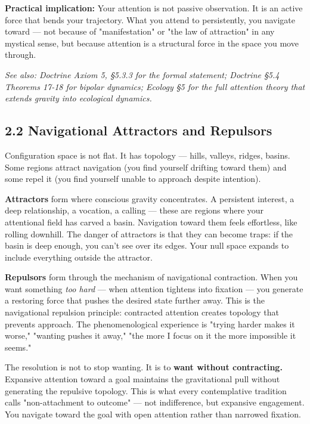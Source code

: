\textbf{Practical implication:} Your attention is not passive observation. It is an active force that bends your trajectory. What you attend to persistently, you navigate toward — not because of "manifestation" or "the law of attraction" in any mystical sense, but because attention is a structural force in the space you move through.


\textit{See also: Doctrine Axiom 5, §5.3.3 for the formal statement; Doctrine §5.4 Theorems 17-18 for bipolar dynamics; Ecology §5 for the full attention theory that extends gravity into ecological dynamics.}


\subsection*{2.2 Navigational Attractors and Repulsors}


Configuration space is not flat. It has topology — hills, valleys, ridges, basins. Some regions attract navigation (you find yourself drifting toward them) and some repel it (you find yourself unable to approach despite intention).


\textbf{Attractors} form where conscious gravity concentrates. A persistent interest, a deep relationship, a vocation, a calling — these are regions where your attentional field has carved a basin. Navigation toward them feels effortless, like rolling downhill. The danger of attractors is that they can become traps: if the basin is deep enough, you can't see over its edges. Your null space expands to include everything outside the attractor.


\textbf{Repulsors} form through the mechanism of navigational contraction. When you want something \textit{too hard} — when attention tightens into fixation — you generate a restoring force that pushes the desired state further away. This is the navigational repulsion principle: contracted attention creates topology that prevents approach. The phenomenological experience is "trying harder makes it worse," "wanting pushes it away," "the more I focus on it the more impossible it seems."


The resolution is not to stop wanting. It is to \textbf{want without contracting.} Expansive attention toward a goal maintains the gravitational pull without generating the repulsive topology. This is what every contemplative tradition calls "non-attachment to outcome" — not indifference, but expansive engagement. You navigate toward the goal with open attention rather than narrowed fixation.


